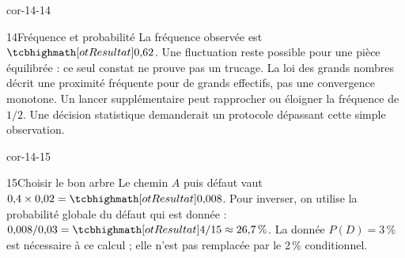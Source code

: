 \begin{blocLivre}{cor-14-14}
\begin{corrige}{14}{Fréquence et probabilité}
La fréquence observée est $\res{0{,}62}$. Une fluctuation reste possible pour une pièce équilibrée : ce seul constat ne prouve pas un trucage. La loi des grands nombres décrit une proximité fréquente pour de grands effectifs, pas une convergence monotone. Un lancer supplémentaire peut rapprocher ou éloigner la fréquence de $1/2$. Une décision statistique demanderait un protocole dépassant cette simple observation.
\end{corrige}
\end{blocLivre}
\begin{blocLivre}{cor-14-15}
\begin{corrige}{15}{Choisir le bon arbre}
Le chemin $A$ puis défaut vaut $0{,}4\times0{,}02=\res{0{,}008}$. Pour inverser, on utilise la probabilité globale du défaut qui est donnée : $0{,}008/0{,}03=\res{4/15\approx26{,}7\,\%}$. La donnée $P(D)=3\,\%$ est nécessaire à ce calcul ; elle n’est pas remplacée par le 2\,\% conditionnel.
\label{fig-cor-14-15}
\end{corrige}
\end{blocLivre}
